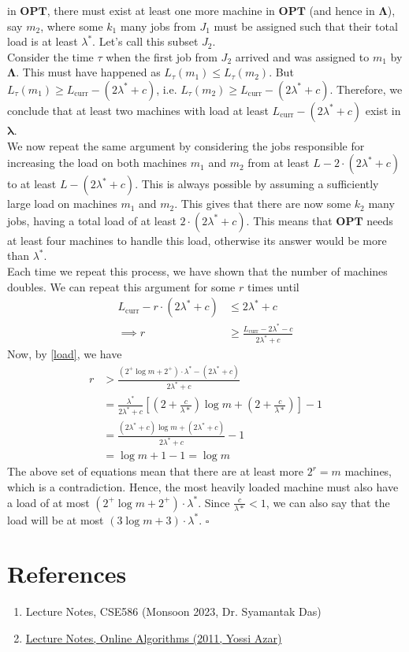 \documentclass[11pt]{article}
\begin{document}
in $\mathbf{OPT}$, there must exist at least one more machine in $\mathbf{OPT}$ (and hence in $\mathbf{\Lambda}$), say $m_{2}$, where
some $k_{1}$ many jobs from $J_{1}$ must be assigned such that their total load is at least $\lambda^{*}$. Let's call this subset $J_{2}$. \\
Consider the time $\tau$ when the first job from $J_{2}$ arrived and was assigned to $m_{1}$ by $\mathbf{\Lambda}$. This must have
happened as $L_{\tau}(m_{1}) \leq L_{\tau}(m_{2})$. But $L_{\tau}(m_{1}) \geq L_{\text{curr}} - (2 \lambda^{*} + c)$, i.e.
$L_{\tau}(m_{2}) \geq L_{\text{curr}} - (2 \lambda^{*} + c)$. Therefore, we conclude that at least two machines with load at least
$L_{\text{curr}} - (2 \lambda^{*} + c)$ exist in $\mathbf{\lambda}$. \\
We now repeat the same argument by considering the jobs responsible for increasing the load on both machines $m_{1}$ and $m_{2}$
from at least $L - 2 \cdot (2\lambda^{*} + c)$ to at least $L - (2 \lambda^{*} + c)$. This is always possible by assuming a sufficiently
large load on machines $m_{1}$ and $m_{2}$. This gives that there are now some $k_{2}$ many jobs, having a total load of at least
$2 \cdot (2 \lambda^{*} + c)$. This means that $\mathbf{OPT}$ needs at least four machines to handle this load, otherwise its answer
would be more than $\lambda^{*}$. \\
Each time we repeat this process, we have shown that the number of machines doubles. We can repeat this argument for some $r$ times until
\begin{align}
    L_{\text{curr}} - r \cdot (2 \lambda^{*} + c) &\leq 2 \lambda^{*} + c \\
    \implies r &\geq \frac{L_{\text{curr}} - 2 \lambda^{*} - c}{2 \lambda^{*} + c}
\end{align}
Now, by \eqref{load}, we have
\begin{align}
    r &> \frac{(\mathit{2^{+}} \log{m} + \mathit{2^{+}}) \cdot \lambda^{*} - (2 \lambda^{*} + c)}{2 \lambda^{*} + c} \\
    &= \frac{\lambda^{*}}{2 \lambda^{*} + c} \left[ \left(2 + \frac{c}{\lambda*} \right) \log{m} + \left( 2 + \frac{c}{\lambda*} \right) \right] - 1 \\
    &= \frac{(2 \lambda^{*} + c) \log{m} + (2 \lambda^{*} + c)}{2 \lambda^{*} + c} - 1 \\
    &= \log{m} + 1 - 1 = \log{m}
\end{align}
The above set of equations mean that there are at least more $2^{r} = m$ machines, which is a contradiction.
Hence, the most heavily loaded machine must also have a load of at most $(\mathit{2}^{+} \log{m} + \mathit{2}^{+}) \cdot \lambda^{*}$.
Since $\frac{c}{\lambda*} < 1$, we can also say that the load will be at most $(3 \log{m} + 3) \cdot \lambda^{*}$. \hfill $\square$


\section*{References}
\begin{enumerate}
    \item Lecture Notes, CSE586 (Monsoon 2023, Dr. Syamantak Das)
    \item \href{http://www.cs.tau.ac.il/~azar/Online-Class2.pdf}{Lecture Notes, Online Algorithms (2011, Yossi Azar)}
\end{enumerate}
\end{document}
